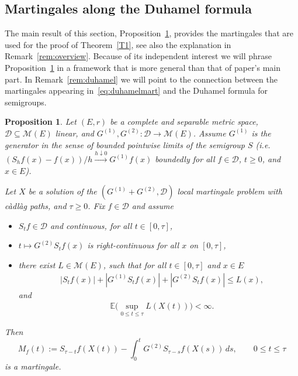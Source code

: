\documentclass{imsart}
\theoremstyle{plain}
\newtheorem{proposition}[theorem]{Proposition}
\theoremstyle{definition}
\begin{document}
\begin{appendix}

\section{Martingales along the Duhamel formula}
\label{app:duhamel}
The main result of this section, Proposition~\ref{T:434appl}, provides the martingales that are used for the proof of Theorem~\ref{T1}, see also the explanation in Remark~\ref{rem:overview}. Because of its independent interest we will phrase Proposition~\ref{T:434appl} in a framework that is more general than that of paper's main part. In Remark~\ref{rem:duhamel} we will point to the connection between the martingales appearing in~\eqref{eq:duhamelmart} and the Duhamel formula for semigroups.



\begin{proposition}\label{T:434appl}
Let $(E,r)$ be a complete and separable metric space, $\mathcal D \subseteq \mathcal M(E)$ linear, and $G^{(1)}, G^{(2)} : \mathcal D \to \mathcal M(E)$. Assume $G^{(1)}$ is the generator in the sense of bounded pointwise limits of the semigroup $S$ (i.e.\ $(S_{h}f(x) - f(x))/h \xrightarrow{h\downarrow 0} G^{(1)}  f(x)$ boundedly for all $f \in \mathcal D$, $t\geq 0$, and $x\in E$). 

Let $X$ be a solution of the $(G^{(1)} + G^{(2)}, \mathcal D)$ local martingale problem with càdlàg paths, and $\tau \geq 0$. Fix $f \in \mathcal D$ and assume
\begin{itemize}
    \item[(i)] $S_{t} f \in \mathcal D$ and continuous, for all $t \in [0,\tau]$,
    \item[(ii)] $t \mapsto G^{(2)} S_{t}f(x)$ is right-continuous for all $x$ on $[0,\tau]$,
    \item[(iii)] there exist $L \in \mathcal M(E)$, such that for all $t \in [0, \tau]$ and $x\in E$ 
\begin{align}
\label{eq:L1}
    &|S_{t} f(x) | + |G^{(1)} S_{t}f(x)| + |G^{(2)} S_{t}f(x)| \leq L(x),
\end{align}
and
\begin{align}
    \label{eq:L2}
    & \mathbb E\big(\sup_{0\leq t \leq \tau} L(X(t))\big) < \infty.
\end{align}
\end{itemize}
Then
\begin{equation} \label{eq:duhamelmart}
  M_f(t) := S_{\tau-t} f(X(t)) - \int_0^t G^{(2)} S_{\tau-s} f(X(s)) \, ds,
  \qquad 0 \le t \le \tau
\end{equation}
is a martingale.
\end{proposition}




\end{appendix}
\end{document}
